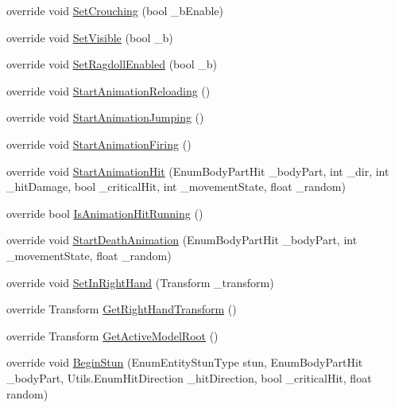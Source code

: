 \begin{DoxyCompactItemize}
\item 
override void \mbox{\hyperlink{class_mecanim_s_d_x_a8e52240230b2681407d066978ad72b57}{Set\+Crouching}} (bool \+\_\+b\+Enable)
\item 
override void \mbox{\hyperlink{class_mecanim_s_d_x_a454125391067d3ee2716a87bad981cb1}{Set\+Visible}} (bool \+\_\+b)
\item 
override void \mbox{\hyperlink{class_mecanim_s_d_x_a1520d85f59b9e0cb8094befb872147ef}{Set\+Ragdoll\+Enabled}} (bool \+\_\+b)
\item 
override void \mbox{\hyperlink{class_mecanim_s_d_x_a8d5746017b67ff664d5dabb6504f1ceb}{Start\+Animation\+Reloading}} ()
\item 
override void \mbox{\hyperlink{class_mecanim_s_d_x_aee9c866fd451db510e03b08ad3cb1275}{Start\+Animation\+Jumping}} ()
\item 
override void \mbox{\hyperlink{class_mecanim_s_d_x_a91d1a99e0e1b013b3f7ee8285704d145}{Start\+Animation\+Firing}} ()
\item 
override void \mbox{\hyperlink{class_mecanim_s_d_x_ae3b64d7b8703ed699a8db437c61d5033}{Start\+Animation\+Hit}} (Enum\+Body\+Part\+Hit \+\_\+body\+Part, int \+\_\+dir, int \+\_\+hit\+Damage, bool \+\_\+critical\+Hit, int \+\_\+movement\+State, float \+\_\+random)
\item 
override bool \mbox{\hyperlink{class_mecanim_s_d_x_ae88c927c3af0445cfaf3e7620a518df2}{Is\+Animation\+Hit\+Running}} ()
\item 
override void \mbox{\hyperlink{class_mecanim_s_d_x_a81a3f3be4926e6d1e9b087781eb267ac}{Start\+Death\+Animation}} (Enum\+Body\+Part\+Hit \+\_\+body\+Part, int \+\_\+movement\+State, float \+\_\+random)
\item 
override void \mbox{\hyperlink{class_mecanim_s_d_x_a1f10e8667d155ce0230dac7160971664}{Set\+In\+Right\+Hand}} (Transform \+\_\+transform)
\item 
override Transform \mbox{\hyperlink{class_mecanim_s_d_x_ae6cc2b4b1b64cc6623b24a4914e4a6f1}{Get\+Right\+Hand\+Transform}} ()
\item 
override Transform \mbox{\hyperlink{class_mecanim_s_d_x_a51d0169cd3e746d50b416609ab89a677}{Get\+Active\+Model\+Root}} ()
\item 
override void \mbox{\hyperlink{class_mecanim_s_d_x_a4509ee3ec82243658c99206345c17901}{Begin\+Stun}} (Enum\+Entity\+Stun\+Type stun, Enum\+Body\+Part\+Hit \+\_\+body\+Part, Utils.\+Enum\+Hit\+Direction \+\_\+hit\+Direction, bool \+\_\+critical\+Hit, float random)
\item 

\end{DoxyCompactItemize}
